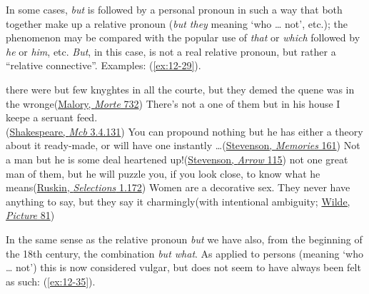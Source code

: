 In some cases, \textit{but} is followed by a personal pronoun in such a way that both together make up a relative pronoun (\textit{but they} meaning `who {\dots} not', etc.); the phenomenon may be compared with the popular use of \textit{that} or \textit{which} followed by \textit{he} or \textit{him}, etc. \textit{But}, in this case, is not a real relative pronoun, but rather a ``relative connective''. Examples: (\ref{ex:12-29}).

\ea \label{ex:12-29}
\ea
there were but few knyghtes in all the courte, but they demed the quene was in the wronge\hfill(\href{https://quod.lib.umich.edu/c/cme/MaloryWks2/1:20.5?rgn=div2;view=fulltext#pb.732}{Malory, \textit{Morte} 732})
\ex
There's not a one of them but in his house I keepe a seruant feed.\\\hfill(\href{https://internetshakespeare.uvic.ca/doc/Mac_F1/scene/3.4/index.html#tln-1410}{Shakespeare, \textit{Mcb} 3.4.131}) %
\ex
You can propound nothing but he has either a theory about it ready-made, or will have one instantly {\dots}\hfill(\href{https://archive.org/details/memoriesportrait00sev/page/150/mode/2up?q=%22you+can+propound+nothing%22&view=theater}{Stevenson, \textit{Memories} 161}) %
\ex
Not a man but he is some deal heartened up!\hfill(\href{https://archive.org/details/blackarrowtaleof00stevrich/page/100/mode/2up?view=theater&q=%22not+a+man+but+he+is%22}{Stevenson, \textit{Arrow} 115}) %
\ex
not one great man of them, but he will puzzle you, if you look close, to know what he means\hfill(\href{https://books.google.co.jp/books?id=9p8MAAAAIAAJ&pg=PA59&lpg=PA59&dq=%22Not+one+great+man+of+them,+but+he+will+puzzle+you%22+ruskin&source=bl&ots=O0Q_qv28LD&sig=ACfU3U2IW79CceEASvkqrE8CAxOKJ9IhZA&hl=en&sa=X&ved=2ahUKEwjKrc26_72FAxXnr1YBHWE0DYkQ6AF6BAgJEAM#v=onepage&q=%22Not%20one%20great%20man%20of%20them%2C%20but%20he%20will%20puzzle%20you%22%20ruskin&f=false}{Ruskin, \textit{Selections} 1.172})
\ex
Women are a decorative sex. They never have anything to say, but they say it charmingly\hfill(with intentional ambiguity; \href{https://archive.org/details/pictureofdoriang0000osca_q3d0/page/56/mode/2up?q=%22decorative+sex%22&view=theater}{Wilde, \textit{Picture} 81}) %
\z
\z

\label{relative_employment}In the same sense as the relative pronoun \textit{but} we have also, from the beginning of the 18th century, the combination \textit{but what}. As applied to persons (meaning `who {\dots} not') this is now considered vulgar, but does not seem to have always been felt as such: (\ref{ex:12-35}).

